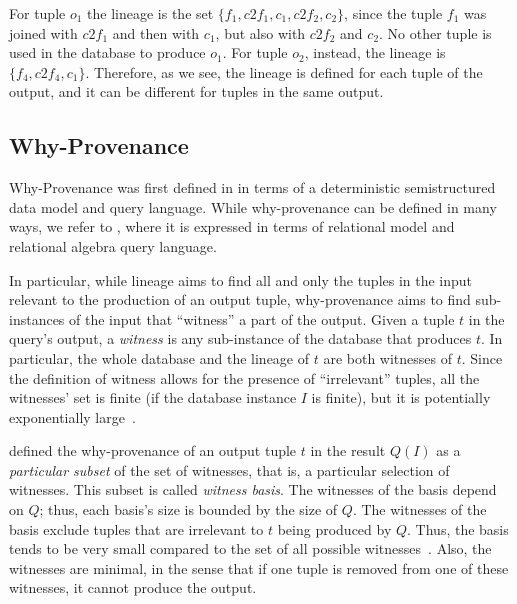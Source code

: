 For tuple $o_1$ the lineage is the set $\{f_1, c2f_1, c_1, c2f_2, c_2\}$, since the tuple $f_1$ was joined with $c2f_1$ and then with $c_1$, but also with $c2f_2$ and $c_2$. No other tuple is used in the database to produce $o_1$.
For tuple $o_2$, instead, the lineage is $\{ f_4, c2f_4, c_1\}$.
Therefore, as we see, the lineage is defined for each tuple of the output, and it can be different for tuples in the same output. 

\subsection{Why-Provenance}
Why-Provenance was first defined in \citep{WhyProvBuneman} in terms of a deterministic semistructured data model and query language. 
While why-provenance can be defined in many ways, we refer to \citep{CheneyProvSurvey}, where it is expressed in terms of relational model and relational algebra query language.

In particular, while lineage aims to find all and only the tuples in the input relevant to the production of an output tuple, why-provenance aims to find sub-instances of the input that ``witness'' a part of the output. 
Given a tuple $t$ in the query's output, a \emph{witness} is any sub-instance of the database that produces $t$.
In particular, the whole database and the lineage of $t$ are both witnesses of $t$.
Since the definition of witness allows for the presence of ``irrelevant'' tuples, all the witnesses' set is finite (if the database instance $I$ is finite), but it is potentially exponentially large~\citep{CheneyProvSurvey}.

\cite{WhyProvBuneman} defined the why-provenance of an output tuple $t$ in the result $Q(I)$ as a \emph{particular subset} of the set of witnesses, that is, a particular selection of witnesses. This subset is called \emph{witness basis}.
The witnesses of the basis depend on $ Q $; thus, each basis's size is bounded by the size of $ Q $. The witnesses of the basis exclude tuples that are irrelevant to $t$ being produced by $Q$. Thus, the basis tends to be very small compared to the set of all possible witnesses~\citep{CheneyProvSurvey}.
Also, the witnesses are minimal, in the sense that if one tuple is removed from one of these witnesses, it cannot produce the output. %


